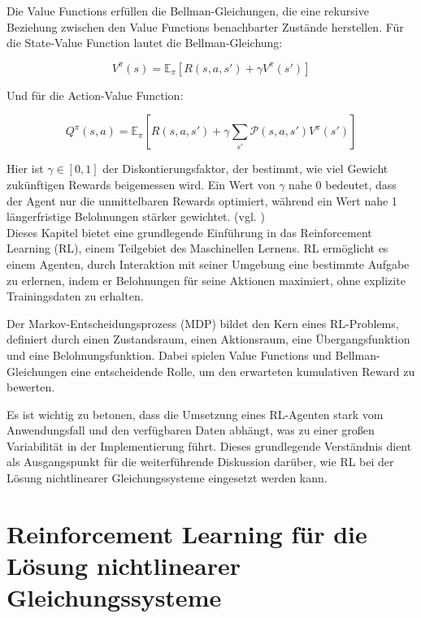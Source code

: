 \documentclass{article}
\theoremstyle{newline}
\begin{document}
\begin{onehalfspace}
Die Value Functions erfüllen die Bellman-Gleichungen, die eine rekursive Beziehung zwischen den Value Functions benachbarter Zustände herstellen. Für die State-Value Function lautet die Bellman-Gleichung:

\begin{equation}
	V^\pi(s) = \mathbb{E}_\pi \left[ R(s, a, s') + \gamma V^\pi(s') \right]
\end{equation}

Und für die Action-Value Function:

\begin{equation}
	Q^\pi(s, a) = \mathbb{E}_\pi \left[ R(s, a, s') + \gamma \sum_{s'} \mathcal{P}(s, a, s') V^\pi(s') \right]
\end{equation}

Hier ist $\gamma \in [0, 1]$ der Diskontierungsfaktor, der bestimmt, wie viel Gewicht zukünftigen Rewards beigemessen wird. Ein Wert von $\gamma$ nahe 0 bedeutet, dass der Agent nur die unmittelbaren Rewards optimiert, während ein Wert nahe 1 längerfristige Belohnungen stärker gewichtet. (vgl. \cite{Lia2022})
\\

Dieses Kapitel bietet eine grundlegende Einführung in das Reinforcement Learning (RL), einem Teilgebiet des Maschinellen Lernens. RL ermöglicht es einem Agenten, durch Interaktion mit seiner Umgebung eine bestimmte Aufgabe zu erlernen, indem er Belohnungen für seine Aktionen maximiert, ohne explizite Trainingsdaten zu erhalten.

Der Markov-Entscheidungsprozess (MDP) bildet den Kern eines RL-Problems, definiert durch einen Zustandsraum, einen Aktionsraum, eine Übergangsfunktion und eine Belohnungsfunktion. Dabei spielen Value Functions und Bellman-Gleichungen eine entscheidende Rolle, um den erwarteten kumulativen Reward zu bewerten.

Es ist wichtig zu betonen, dass die Umsetzung eines RL-Agenten stark vom Anwendungsfall und den verfügbaren Daten abhängt, was zu einer großen Variabilität in der Implementierung führt. Dieses grundlegende Verständnis dient als Ausgangspunkt für die weiterführende Diskussion darüber, wie RL bei der Lösung nichtlinearer Gleichungssysteme eingesetzt werden kann. 

\section{Reinforcement Learning für die Lösung nichtlinearer Gleichungssysteme}


\end{onehalfspace}
\end{document}

